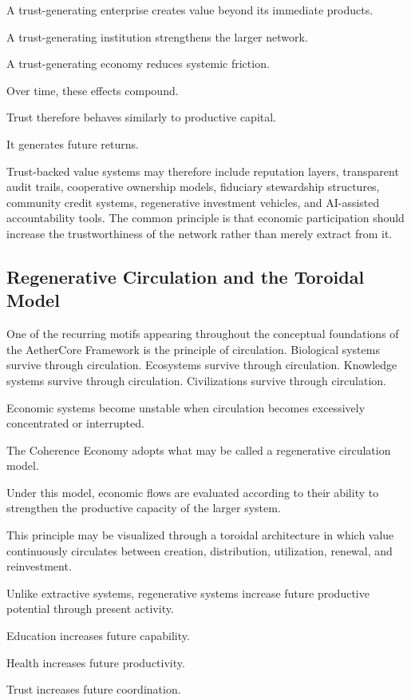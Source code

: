 \documentclass[12pt]{article}
\begin{document}
A trust-generating enterprise creates value beyond its immediate products.

A trust-generating institution strengthens the larger network.

A trust-generating economy reduces systemic friction.

Over time, these effects compound.

Trust therefore behaves similarly to productive capital.

It generates future returns.

Trust-backed value systems may therefore include reputation layers, transparent audit trails, cooperative ownership models, fiduciary stewardship structures, community credit systems, regenerative investment vehicles, and AI-assisted accountability tools. The common principle is that economic participation should increase the trustworthiness of the network rather than merely extract from it.

\subsection{Regenerative Circulation and the Toroidal Model}

One of the recurring motifs appearing throughout the conceptual foundations of the AetherCore Framework is the principle of circulation. Biological systems survive through circulation. Ecosystems survive through circulation. Knowledge systems survive through circulation. Civilizations survive through circulation.

Economic systems become unstable when circulation becomes excessively concentrated or interrupted.

The Coherence Economy adopts what may be called a regenerative circulation model.

Under this model, economic flows are evaluated according to their ability to strengthen the productive capacity of the larger system.

This principle may be visualized through a toroidal architecture in which value continuously circulates between creation, distribution, utilization, renewal, and reinvestment.

Unlike extractive systems, regenerative systems increase future productive potential through present activity.

Education increases future capability.

Health increases future productivity.

Trust increases future coordination.
\end{document}
